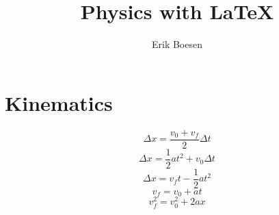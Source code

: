 \documentclass[twocolumn]{article}
\begin{document}
\title{Physics with \LaTeX}
\author{Erik Boesen}
\maketitle

\section*{Kinematics}
$$\Delta x=\frac{v_0+v_f}{2}\Delta t$$
$$\Delta x=\frac{1}{2}at^2+v_0\Delta t$$
$$\Delta x=v_ft-\frac{1}{2}at^2$$
$$v_f=v_0+at$$
$$v_f^2=v_0^2+2ax$$
\end{document}
